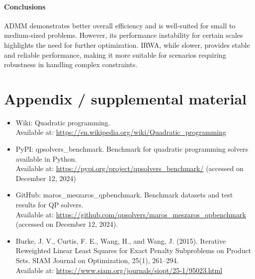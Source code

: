 \documentclass{article}
\begin{document}
\paragraph{Conclusions}

ADMM demonstrates better overall efficiency and is well-suited for small to medium-sized problems. However, its performance instability for certain scales highlights the need for further optimization. IRWA, while slower, provides stable and reliable performance, making it more suitable for scenarios requiring robustness in handling complex constraints.





\appendix

\section{Appendix / supplemental material}
\begin{itemize}
    \item Wiki: Quadratic programming. \\
    Available at: \url{https://en.wikipedia.org/wiki/Quadratic_programming}
    \item PyPI: qpsolvers\_benchmark. Benchmark for quadratic programming solvers available in Python. \\Available at: \url{https://pypi.org/project/qpsolvers_benchmark/} (accessed on December 12, 2024)
    \item GitHub: maros\_meszaros\_qpbenchmark. Benchmark datasets and test results for QP solvers. \\Available at: \url{https://github.com/qpsolvers/maros_meszaros_qpbenchmark} (accessed on December 12, 2024).
    \item Burke, J. V., Curtis, F. E., Wang, H., and Wang, J. (2015). Iterative Reweighted Linear Least Squares for Exact Penalty Subproblems on Product Sets. SIAM Journal on Optimization, 25(1), 261–294.\\
    Available at: \url{https://www.siam.org/journals/siopt/25-1/95023.html}
\end{itemize}
\end{document}

